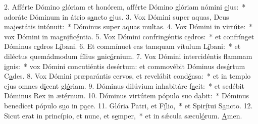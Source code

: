 2. Afférte Dómino glóriam et honórem, afférte Dómino glóriam nómini \uline{e}jus:~* adoráte Dóminum in átrio s\uline{a}ncto \uline{e}jus.
3. Vox Dómini super aquas, Deus majestátis int\uline{ó}nuit:~* Dóminus super \uline{a}quas m\uline{u}ltas.
4. Vox Dómini in virt\uline{ú}te:~* vox Dómini in magn\uline{i}fic\uline{é}ntia.
5. Vox Dómini confringéntis c\uline{e}dros:~* et confrínget Dóminus c\uline{e}dros L\uline{í}bani.
6. Et commínuet eas tamquam vítulum L\uline{í}bani:~* et diléctus quemádmodum fílius \uline{u}nic\uline{ó}rnium.
7. Vox Dómini intercidéntis flammam \uline{i}gnis:~* vox Dómini concutiéntis desértum: et commovébit Dóminus des\uline{é}rtum C\uline{a}des.
8. Vox Dómini præparántis cervos, et revelábit cond\uline{é}nsa:~* et in templo ejus omnes d\uline{i}cent gl\uline{ó}riam.
9. Dóminus dilúvium inhabitáre f\uline{a}cit:~* et sedébit Dóminus Rex \uline{i}n æt\uline{é}rnum.
10. Dóminus virtútem pópulo suo d\uline{a}bit:~* Dóminus benedícet pópulo s\uline{u}o in p\uline{a}ce.
11. Glória Patri, et F\uline{í}lio,~* et Spir\uline{í}tui S\uline{a}ncto.
12. Sicut erat in princípio, et nunc, et s\uline{e}mper,~* et in sǽcula sæcul\uline{ó}rum. \uline{A}men.
